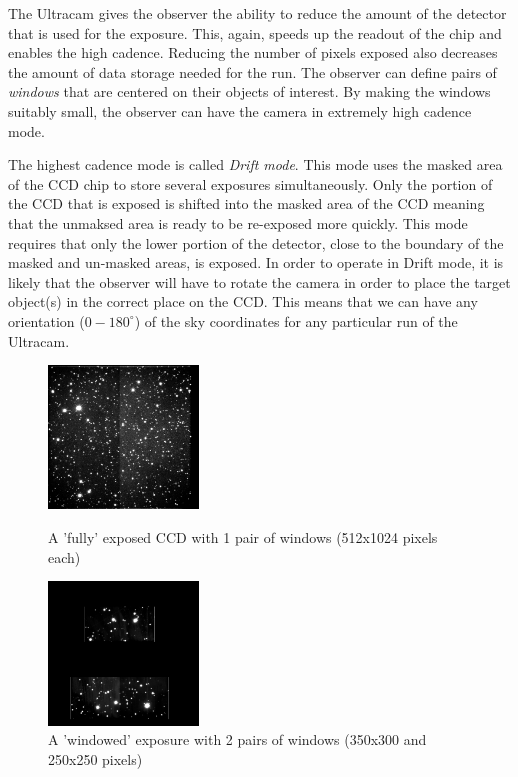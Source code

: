 \documentclass[a4paper,10pt]{article}
\begin{document}
The Ultracam gives the observer the ability to reduce the amount of the detector that is used for the exposure. This, again, speeds up the readout of the chip and enables the high cadence. Reducing the number of pixels exposed also decreases the amount of data storage needed for the run. The observer can define pairs of \emph{windows} that are centered on their objects of interest. By making the windows suitably small, the observer can have the camera in extremely high cadence mode. 

The highest cadence mode is called \emph{Drift mode}. This mode uses the masked area of the CCD chip to store several exposures simultaneously. Only the portion of the CCD that is exposed is shifted into the masked area of the CCD meaning that the unmaksed area is ready to be re-exposed more quickly. This mode requires that only the lower portion of the detector, close to the boundary of the masked and un-masked areas, is exposed. In order to operate in Drift mode, it is likely that the observer will have to rotate the camera in order to place the target object(s) in the correct place on the CCD. This means that we can have any orientation ($0-180^{\circ}$) of the sky coordinates for any particular run of the Ultracam.   

\begin{figure}
\centering
\begin{minipage}{.5\textwidth}
  \centering
  \includegraphics[width=40mm]{images/run010_r.png}
  \caption{A 'fully' exposed CCD with 1 pair of windows (512x1024 pixels each)}
  \label{fig:test1}
\end{minipage}%
\begin{minipage}{.5\textwidth}
  \centering
  \includegraphics[width=40mm]{images/run016_r.png}
  \caption{A 'windowed' exposure with 2 pairs of windows (350x300 and 250x250 pixels)}
  \label{fig:test2}
\end{minipage}
\end{figure}
\end{document}
